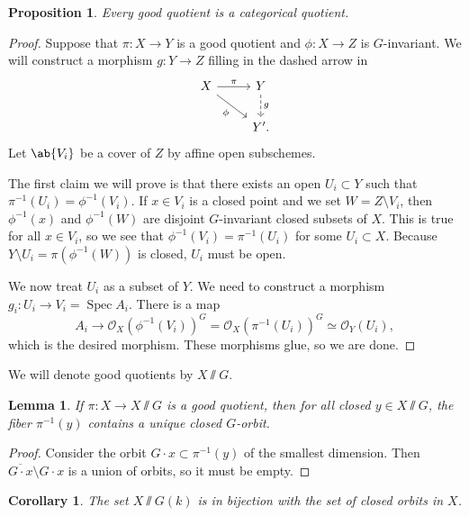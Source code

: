 \documentclass{amsart}
\newtheorem{cor}[thm]{Corollary}
\newtheorem{prop}[thm]{Proposition}
\newtheorem{lem}[thm]{Lemma}
\theoremstyle{definition}
\theoremstyle{remark}
\theoremstyle{plain}
\theoremstyle{definition}
\theoremstyle{remark}
\newcommand{\mc}[1]{\mathcal{#1}}
\newcommand{\ol}[1]{\overline{#1}}
\newcommand{\1}{\mathbf{1}}
\newcommand{\2}{\mathbf{2}}
\newcommand{\3}{\mathbf{3}}
\DeclareMathOperator{\Spec}{Spec}
\begin{document}
\begin{prop}
    Every good quotient is a categorical quotient.
\end{prop}

\begin{proof}
    Suppose that \(\pi \colon X \to Y\) is a good quotient and \(\phi \colon X \to Z\) is \(G\)-invariant. We will construct a morphism \(g \colon Y \to Z\) filling in the dashed arrow in
    \begin{equation*}
    \begin{tikzcd}
        X \ar{r}{\pi} \ar[swap]{dr}{\phi} & Y \ar[dashrightarrow]{d}{g} \\
        & Y'.
    \end{tikzcd}
    \end{equation*}
    Let \(\ab\{V_i \}\) be a cover of \(Z\) by affine open subschemes. 

    The first claim we will prove is that there exists an open \(U_i \subset Y\) such that \(\pi^{-1}{(U_i)} = \phi^{-1}{(V_i)}\). If \(x \in V_i\) is a closed point and we set \(W = Z \setminus V_i\), then \(\phi^{-1}{(x)}\) and \(\phi^{-1}{(W)}\) are disjoint \(G\)-invariant closed subsets of \(X\). This is true for all \(x \in V_i\), so we see that \(\phi^{-1}{(V_i)} = \pi^{-1}{(U_i)}\) for some \(U_i \subset X\). Because \(Y \setminus U_i = \pi(\phi^{-1}{(W)})\) is closed, \(U_i\) must be open.

    We now treat \(U_i\) as a subset of \(Y\). We need to construct a morphism \(g_i \colon U_i \to V_i = \Spec A_i\). There is a map
    \[ A_i \to \mc{O}_X(\phi^{-1}{(V_i)})^G = \mc{O}_X(\pi^{-1}{(U_i)})^G \simeq \mc{O}_Y(U_i), \]
    which is the desired morphism. These morphisms glue, so we are done.
\end{proof}

We will denote good quotients by \(X \sslash G\).
\begin{lem}
    If \(\pi \colon X \to X \sslash G\) is a good quotient, then for all closed \(y \in X \sslash G\), the fiber \(\pi^{-1}{(y)}\) contains a unique closed \(G\)-orbit.
\end{lem}

\begin{proof}
    Consider the orbit \(G \cdot x \subset \pi^{-1}(y)\) of the smallest dimension. Then \(\ol{G \cdot x} \setminus G \cdot x\) is a union of orbits, so it must be empty.
\end{proof}

\begin{cor}
    The set \(X \sslash G (k)\) is in bijection with the set of closed orbits in \(X\).
\end{cor}
\end{document}
